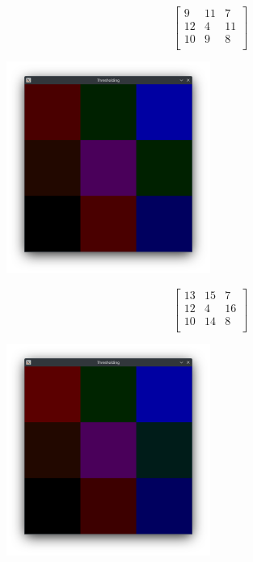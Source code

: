 \begin{equation*}
    \begin{bmatrix}
        9  & 11 & 7  \\
        12 & 4  & 11 \\
        10 & 9  & 8  \\
    \end{bmatrix}
\end{equation*}

\includegraphics[width=0.5\textwidth]{./latex/img/m3}

\begin{equation*}
    \begin{bmatrix}
        13 & 15 & 7  \\
        12 & 4  & 16 \\
        10 & 14 & 8  \\
    \end{bmatrix}
\end{equation*}

\includegraphics[width=0.5\textwidth]{./latex/img/m4}
